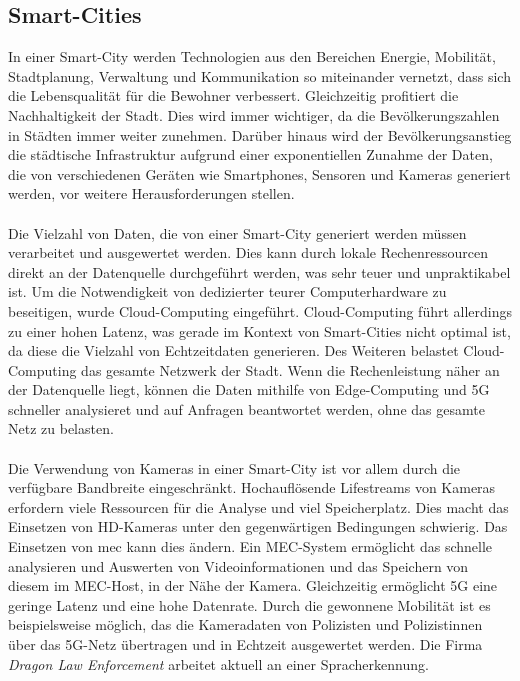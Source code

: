 \documentclass[runningheads]{llncs}
\numberwithin{figure}{section}
\begin{document}
\subsection{Smart-Cities}
\label{subsec:Smart Cities}
In einer Smart-City werden Technologien aus den Bereichen Energie, Mobilität, Stadtplanung, 
Verwaltung und Kommunikation so miteinander vernetzt, dass sich die Lebensqualität für die Bewohner verbessert. 
Gleichzeitig profitiert die Nachhaltigkeit der Stadt. Dies wird immer wichtiger, da die Bevölkerungszahlen in 
Städten immer weiter zunehmen.
Darüber hinaus wird der Bevölkerungsanstieg die städtische Infrastruktur aufgrund einer 
exponentiellen Zunahme der Daten, die von verschiedenen Geräten wie Smartphones, Sensoren und Kameras generiert werden, 
vor weitere Herausforderungen stellen. 
\\
\\
Die Vielzahl von Daten, die von einer Smart-City generiert werden müssen verarbeitet und ausgewertet werden. Dies kann durch lokale Rechenressourcen
direkt an der Datenquelle durchgeführt werden, was sehr teuer und unpraktikabel ist. 
Um die Notwendigkeit von dedizierter teurer Computerhardware zu beseitigen, wurde Cloud-Computing eingeführt. Cloud-Computing führt allerdings
zu einer hohen Latenz, was gerade im Kontext von Smart-Cities nicht optimal ist, da diese die Vielzahl von Echtzeitdaten generieren.
Des Weiteren belastet Cloud-Computing das gesamte Netzwerk der Stadt. 
Wenn die Rechenleistung näher an der Datenquelle liegt, können die Daten mithilfe von Edge-Computing und 5G schneller analysieret
und auf Anfragen beantwortet werden, ohne das gesamte Netz zu belasten.
\\
\\
Die Verwendung von Kameras in einer Smart-City ist vor allem durch die verfügbare Bandbreite eingeschränkt. 
Hochauflösende Lifestreams von Kameras erfordern viele Ressourcen für die Analyse und viel Speicherplatz. 
Dies macht das Einsetzen von HD-Kameras unter den gegenwärtigen Bedingungen schwierig.
Das Einsetzen von \acrlong{mec} kann dies ändern. Ein MEC-System ermöglicht das schnelle analysieren und Auswerten von
Videoinformationen und das Speichern von diesem im MEC-Host, in der Nähe der Kamera. Gleichzeitig ermöglicht 5G eine geringe Latenz und eine 
hohe Datenrate. Durch die gewonnene Mobilität ist es beispielsweise möglich, das die Kameradaten von Polizisten und Polizistinnen über das 5G-Netz
übertragen und in Echtzeit ausgewertet werden. Die Firma \textit{Dragon Law Enforcement} arbeitet aktuell an einer Spracherkennung.
\end{document}
